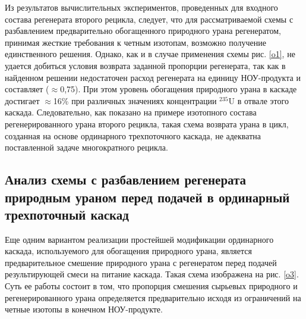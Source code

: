 Из результатов вычислительных экспериментов, проведенных для входного состава регенерата второго рецикла, следует, что для рассматриваемой схемы с разбавлением предварительно обогащенного природного урана регенератом, принимая жесткие требования к четным изотопам, возможно получение единственного решения. Однако, как и в случае применения схемы рис. \ref{o1}, не удается добиться условия возврата заданной пропорции регенерата, так как в найденном решении недостаточен расход регенерата на единицу НОУ-продукта и составляет ($\approx$0,75). При этом уровень обогащения природного урана в каскаде достигает $\approx$16\% при различных значениях концентрации $^{235}$U в отвале этого каскада. Следовательно, как показано на примере изотопного состава регенерированного урана второго рецикла, такая схема возврата урана в цикл, созданная на основе ординарного трехпоточного каскада, не адекватна поставленной задаче многократного рецикла.

\subsection{Анализ схемы с разбавлением регенерата природным ураном перед подачей в ординарный трехпоточный каскад}

Еще одним вариантом реализации простейшей модификации ординарного каскада, используемого для обогащения природного урана, является предварительное смешение природного урана с регенератом перед подачей результирующей смеси на питание каскада. Такая схема изображена на рис. \ref{o3}. Суть ее работы состоит в том, что пропорция смешения сырьевых природного и регенерированного урана  определяется предварительно исходя из ограничений на четные изотопы в конечном НОУ-продукте.

